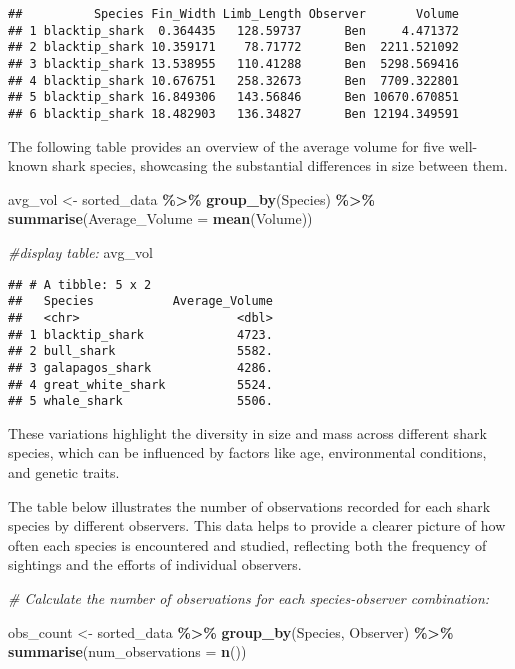 \documentclass[
]{article}
\newenvironment{Shaded}{\begin{snugshade}}{\end{snugshade}}
\newcommand{\AttributeTok}[1]{\textcolor[rgb]{0.13,0.29,0.53}{#1}}
\newcommand{\CommentTok}[1]{\textcolor[rgb]{0.56,0.35,0.01}{\textit{#1}}}
\newcommand{\FunctionTok}[1]{\textcolor[rgb]{0.13,0.29,0.53}{\textbf{#1}}}
\newcommand{\NormalTok}[1]{#1}
\newcommand{\OtherTok}[1]{\textcolor[rgb]{0.56,0.35,0.01}{#1}}
\newcommand{\SpecialCharTok}[1]{\textcolor[rgb]{0.81,0.36,0.00}{\textbf{#1}}}
\begin{document}
\begin{verbatim}
##          Species Fin_Width Limb_Length Observer       Volume
## 1 blacktip_shark  0.364435   128.59737      Ben     4.471372
## 2 blacktip_shark 10.359171    78.71772      Ben  2211.521092
## 3 blacktip_shark 13.538955   110.41288      Ben  5298.569416
## 4 blacktip_shark 10.676751   258.32673      Ben  7709.322801
## 5 blacktip_shark 16.849306   143.56846      Ben 10670.670851
## 6 blacktip_shark 18.482903   136.34827      Ben 12194.349591
\end{verbatim}

The following table provides an overview of the average volume for five
well-known shark species, showcasing the substantial differences in size
between them.

\begin{Shaded}
\begin{Highlighting}[]
\NormalTok{avg\_vol }\OtherTok{\textless{}{-}}\NormalTok{ sorted\_data }\SpecialCharTok{\%\textgreater{}\%}
  \FunctionTok{group\_by}\NormalTok{(Species) }\SpecialCharTok{\%\textgreater{}\%}
  \FunctionTok{summarise}\NormalTok{(}\AttributeTok{Average\_Volume =} \FunctionTok{mean}\NormalTok{(Volume))}

\CommentTok{\#display table: }
\NormalTok{avg\_vol}
\end{Highlighting}
\end{Shaded}

\begin{verbatim}
## # A tibble: 5 x 2
##   Species           Average_Volume
##   <chr>                      <dbl>
## 1 blacktip_shark             4723.
## 2 bull_shark                 5582.
## 3 galapagos_shark            4286.
## 4 great_white_shark          5524.
## 5 whale_shark                5506.
\end{verbatim}

These variations highlight the diversity in size and mass across
different shark species, which can be influenced by factors like age,
environmental conditions, and genetic traits.

The table below illustrates the number of observations recorded for each
shark species by different observers. This data helps to provide a
clearer picture of how often each species is encountered and studied,
reflecting both the frequency of sightings and the efforts of individual
observers.

\begin{Shaded}
\begin{Highlighting}[]
\CommentTok{\# Calculate the number of observations for each species{-}observer combination: }

\NormalTok{obs\_count }\OtherTok{\textless{}{-}}\NormalTok{ sorted\_data }\SpecialCharTok{\%\textgreater{}\%} 
  \FunctionTok{group\_by}\NormalTok{(Species, Observer) }\SpecialCharTok{\%\textgreater{}\%}
  \FunctionTok{summarise}\NormalTok{(}\AttributeTok{num\_observations =} \FunctionTok{n}\NormalTok{())}
\end{Highlighting}
\end{Shaded}
\end{document}
